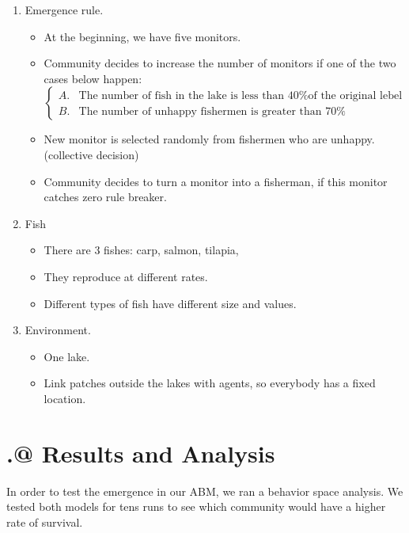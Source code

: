 \documentclass[12pt]{article}
\makeatletter
\newcommand{\Rmnum}[1]{\expandafter\@slowromancap\romannumeral #1@}
\makeatother
\begin{document}
\begin{enumerate}
   
    \item Emergence rule.
    \begin{itemize}
    	\item At the beginning, we have five monitors.
    	\item Community decides to increase the number of monitors if one of the two cases below happen:
    	\[	\left\{
    		\begin{array}{cc}
    		A.&\text{The number of fish in the lake is less than 40\% of the original lebel}\\
    		B.&\text{The number of unhappy fishermen is greater than 70\%}	
    		\end{array}
    		\right    	
    		.\]
    	\item New monitor is selected randomly from fishermen who are unhappy. (collective decision)
    	\item Community decides to turn a monitor into a fisherman, if this monitor catches zero rule breaker.  	
    \end{itemize}
    
  
    \item Fish
    \begin{itemize}
    	\item There are 3 fishes: carp, salmon, tilapia,
    	\item They reproduce at different rates.
    	\item Different types of fish have different size and values.
    \end{itemize}

    
    \item Environment.
    \begin{itemize}
    	\item One lake.
    	\item Link patches outside the lakes with agents, so everybody has a fixed location.
    \end{itemize}
    
\end{enumerate}

\section{\Rmnum{3.} Results and Analysis}
In order to test the emergence in our ABM, we ran a behavior space analysis. We tested both models for tens runs to see which community would have a higher rate of survival. 
\end{document}
